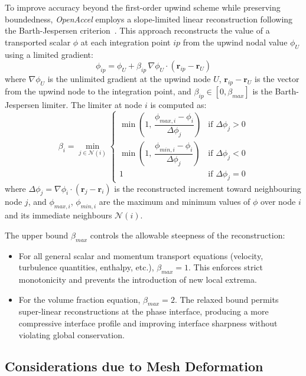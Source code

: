 \documentclass[12pt]{extarticle}
\newcommand{\<}{\langle}
\renewcommand{\>}{\rangle}
\theoremstyle{definition}
\begin{document}
To improve accuracy beyond the first-order upwind scheme while preserving boundedness, \textit{OpenAccel} employs a slope-limited linear reconstruction following the Barth-Jespersen criterion~\cite{barth1989design}. This approach reconstructs the value of a transported scalar $\phi$ at each integration point $ip$ from the upwind nodal value $\phi_U$ using a limited gradient:
\begin{equation}
    \phi_{ip} = \phi_U + \beta_{ip}\,\nabla\phi_U \cdot \left(\textbf{r}_{ip} - \textbf{r}_U\right)
\end{equation}
where $\nabla\phi_U$ is the unlimited gradient at the upwind node $U$, $\textbf{r}_{ip} - \textbf{r}_U$ is the vector from the upwind node to the integration point, and $\beta_{ip} \in [0, \beta_{max}]$ is the Barth-Jespersen limiter. The limiter at node $i$ is computed as:
\begin{equation}
    \beta_i = \min_{j \in \mathcal{N}(i)} \begin{cases}
        \min\!\left(1,\, \dfrac{\phi_{max,i} - \phi_i}{\Delta\phi_j}\right) & \text{if } \Delta\phi_j > 0 \\[1em]
        \min\!\left(1,\, \dfrac{\phi_{min,i} - \phi_i}{\Delta\phi_j}\right) & \text{if } \Delta\phi_j < 0 \\[1em]
        1 & \text{if } \Delta\phi_j = 0
    \end{cases}
\end{equation}
where $\Delta\phi_j = \nabla\phi_i \cdot (\textbf{r}_j - \textbf{r}_i)$ is the reconstructed increment toward neighbouring node $j$, and $\phi_{max,i}$, $\phi_{min,i}$ are the maximum and minimum values of $\phi$ over node $i$ and its immediate neighbours $\mathcal{N}(i)$.

The upper bound $\beta_{max}$ controls the allowable steepness of the reconstruction:
\begin{itemize}
    \item For all general scalar and momentum transport equations (velocity, turbulence quantities, enthalpy, etc.), $\beta_{max} = 1$. This enforces strict monotonicity and prevents the introduction of new local extrema.
    \item For the volume fraction equation, $\beta_{max} = 2$. The relaxed bound permits super-linear reconstructions at the phase interface, producing a more compressive interface profile and improving interface sharpness without violating global conservation.
\end{itemize}

\subsection{Considerations due to Mesh Deformation}
\end{document}
